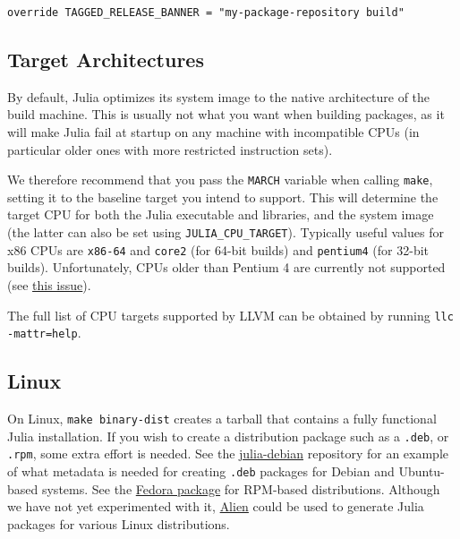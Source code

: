 \begin{lstlisting}
override TAGGED_RELEASE_BANNER = "my-package-repository build"
\end{lstlisting}



\hypertarget{15292951791170792274}{}


\subsection{Target Architectures}



By default, Julia optimizes its system image to the native architecture of the build machine. This is usually not what you want when building packages, as it will make Julia fail at startup on any machine with incompatible CPUs (in particular older ones with more restricted instruction sets).



We therefore recommend that you pass the \texttt{MARCH} variable when calling \texttt{make}, setting it to the baseline target you intend to support. This will determine the target CPU for both the Julia executable and libraries, and the system image (the latter can also be set using \texttt{JULIA\_CPU\_TARGET}). Typically useful values for x86 CPUs are \texttt{x86-64} and \texttt{core2} (for 64-bit builds) and \texttt{pentium4} (for 32-bit builds). Unfortunately, CPUs older than Pentium 4 are currently not supported (see \href{https://github.com/JuliaLang/julia/issues/7185}{this issue}).



The full list of CPU targets supported by LLVM can be obtained by running \texttt{llc -mattr=help}.



\hypertarget{17775253147870272772}{}


\subsection{Linux}



On Linux, \texttt{make binary-dist} creates a tarball that contains a fully functional Julia installation. If you wish to create a distribution package such as a \texttt{.deb}, or \texttt{.rpm}, some extra effort is needed. See the \href{https://github.com/staticfloat/julia-debian}{julia-debian} repository for an example of what metadata is needed for creating \texttt{.deb} packages for Debian and Ubuntu-based systems. See the \href{https://src.fedoraproject.org/rpms/julia}{Fedora package} for RPM-based distributions. Although we have not yet experimented with it, \href{https://wiki.debian.org/Alien}{Alien} could be used to generate Julia packages for various Linux distributions.



